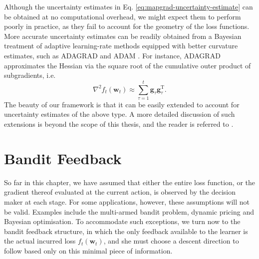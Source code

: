 Although the uncertainty estimates in Eq. \eqref{eq:mapgrad-uncertainty-estimate} can be obtained at no computational overhead, we might expect them to perform poorly in practice, as they fail to account for the geometry of the loss functions. More accurate uncertainty estimates can be readily obtained from a Bayesian treatment of adaptive learning-rate methods equipped with better curvature estimates, such as ADAGRAD \citep{adagrad} and ADAM \citep{adam}. For instance, ADAGRAD approximates the Hessian via the square root of the cumulative outer product of subgradients, i.e.\
\begin{equation}
	\nabla^2 f_t(\mathbf{w}_t)
	\approx \sum_{\tau=1}^t \mathbf{g}_\tau\mathbf{g}_\tau^\text{T}.
\end{equation}
The beauty of our framework is that it can be easily extended to account for uncertainty estimates of the above type. A more detailed discussion of such extensions is beyond the scope of this thesis, and the reader is referred to \citep{badam}.


\section{Bandit Feedback}

\begin{mccorrection}
So far in this chapter, we have assumed that either the entire loss function, or the gradient thereof evaluated at the current action, is observed by the decision maker at each stage. For some applications, however, these assumptions will not be valid. Examples include the multi-armed bandit problem, dynamic pricing and Bayesian optimisation. To accommodate such exceptions, we turn now to the bandit feedback structure, in which the only feedback available to the learner is the actual incurred loss $f_t(\mathbf{w}_t)$, and she must choose a descent direction to follow based only on this minimal piece of information.
\end{mccorrection}

